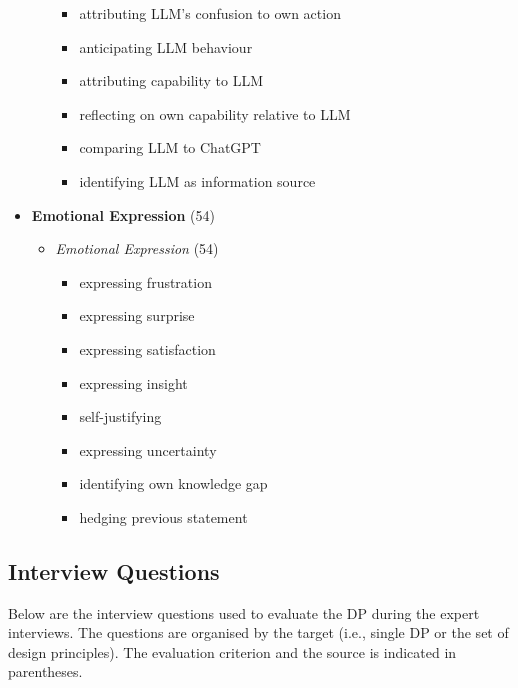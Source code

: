 \begin{multicols}{2}
\begin{itemize}[leftmargin=*, itemsep=2pt, topsep=0pt]
\begin{itemize}[leftmargin=*, nosep]
            \begin{itemize}[leftmargin=*, nosep]
                \item attributing \ac{LLM}'s confusion to own action
                \item anticipating \ac{LLM} behaviour
                \item attributing capability to \ac{LLM}
                \item reflecting on own capability relative to \ac{LLM}
                \item comparing \ac{LLM} to ChatGPT
                \item identifying \ac{LLM} as information source
            \end{itemize}
        \end{itemize}

        \item \textbf{Emotional Expression} (54)
        \begin{itemize}[leftmargin=*, nosep]
            \item \textit{Emotional Expression} (54)
            \begin{itemize}[leftmargin=*, nosep]
                \item expressing frustration
                \item expressing surprise
                \item expressing satisfaction
                \item expressing insight
                \item self-justifying
                \item expressing uncertainty
                \item identifying own knowledge gap
                \item hedging previous statement
            \end{itemize}
        \end{itemize}

    \end{itemize}
\end{multicols}

\clearpage
\subsection*{Interview Questions}

Below are the interview questions used to evaluate the \ac{DP} during the expert interviews. The questions are organised by the target (i.e., single \ac{DP} or the set of design principles). The evaluation criterion and the source is indicated in parentheses.


